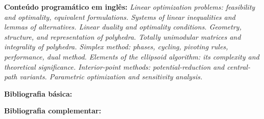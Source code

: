 \documentclass[class=article, crop=false]{standalone}
\begin{document}
\textbf{Conteúdo programático em inglês:} 
\textit{ Linear optimization problems: feasibility and optimality, equivalent
formulations.  Systems of linear inequalities and lemmas of alternatives.
Linear duality and optimality conditions.  Geometry, structure, and
representation of polyhedra.  Totally unimodular matrices and integrality of
polyhedra.  Simplex method: phases, cycling, pivoting rules, performance, dual
method.  Elements of the ellipsoid algorithm: its complexity and theoretical
significance.  Interior-point methods: potential-reduction and central-path
variants.  Parametric optimization and sensitivity analysis. }

\newrefsection
\textbf{Bibliografia básica:}
\nocite{1997-bertsimas-tsitsiklis,2007-gartner-matousek,2015-luenberger-ye} 
\printbibliography

\newrefsection
\textbf{Bibliografia complementar:}
\nocite{2010-bazaraa-etal,2005-goldbarg-luna,2005-roos-etal,1986-schrijver,2020-vanderbei} 
\printbibliography
\end{document}
